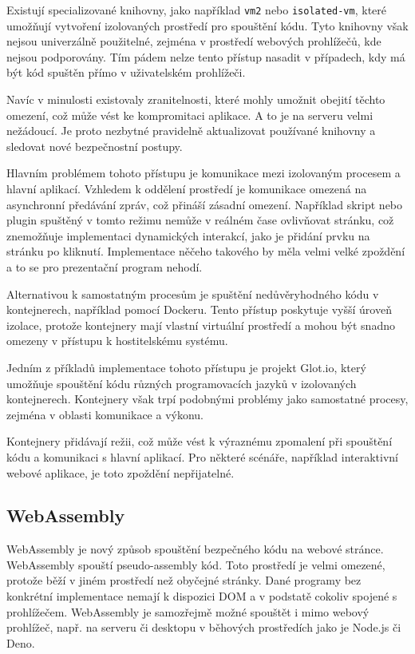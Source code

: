 Existují specializované knihovny, jako například \texttt{vm2} nebo \texttt{isolated-vm}, které umožňují vytvoření izolovaných prostředí pro spouštění kódu. 
Tyto knihovny však nejsou univerzálně použitelné, zejména v prostředí webových prohlížečů, kde nejsou podporovány. 
Tím pádem nelze tento přístup nasadit v případech, kdy má být kód spuštěn přímo v uživatelském prohlížeči.

Navíc v minulosti existovaly zranitelnosti, které mohly umožnit obejití těchto omezení, což může vést ke kompromitaci aplikace.
A to je na serveru velmi nežádoucí.
Je proto nezbytné pravidelně aktualizovat používané knihovny a sledovat nové bezpečnostní postupy.

Hlavním problémem tohoto přístupu je komunikace mezi izolovaným procesem a hlavní aplikací. 
Vzhledem k oddělení prostředí je komunikace omezená na asynchronní předávání zpráv, což přináší zásadní omezení. 
Například skript nebo plugin spuštěný v tomto režimu nemůže v reálném čase ovlivňovat stránku, což znemožňuje implementaci dynamických interakcí, jako je přidání prvku na stránku po kliknutí. 
Implementace něčeho takového by měla velmi velké zpoždění a to se pro prezentační program nehodí.

Alternativou k samostatným procesům je spuštění nedůvěryhodného kódu v kontejnerech, například pomocí Dockeru. 
Tento přístup poskytuje vyšší úroveň izolace, protože kontejnery mají vlastní virtuální prostředí a mohou být snadno omezeny v přístupu k hostitelskému systému.

Jedním z příkladů implementace tohoto přístupu je projekt Glot.io, který umožňuje spouštění kódu různých programovacích jazyků v izolovaných kontejnerech. 
Kontejnery však trpí podobnými problémy jako samostatné procesy, zejména v oblasti komunikace a výkonu. 

Kontejnery přidávají režii, což může vést k výraznému zpomalení při spouštění kódu a komunikaci s hlavní aplikací. 
Pro některé scénáře, například interaktivní webové aplikace, je toto zpoždění nepřijatelné.


\subsection{WebAssembly}\label{text:webassembly}

WebAssembly je nový způsob spouštění bezpečného kódu na webové stránce.
WebAssembly spouští pseudo-assembly kód.
Toto prostředí je velmi omezené, protože běží v jiném prostředí než obyčejné stránky.
Dané programy bez konkrétní implementace nemají k dispozici DOM a v podstatě cokoliv spojené s prohlížečem.
WebAssembly je samozřejmě možné spouštět i mimo webový prohlížeč, např. na serveru či desktopu v běhových prostředích jako je Node.js či Deno.

